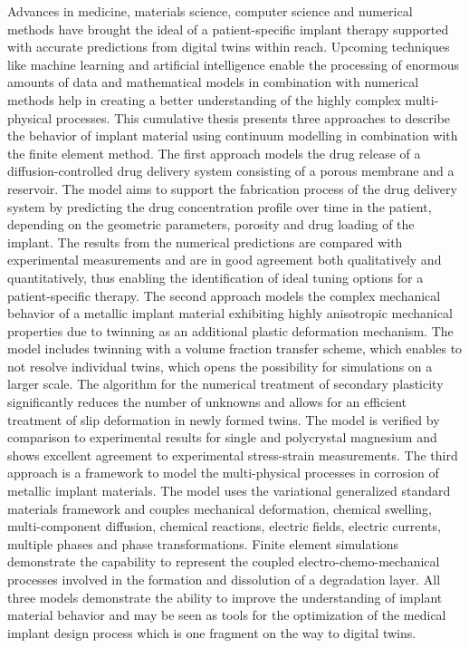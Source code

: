 Advances in medicine, materials science, computer science and numerical methods have brought the ideal of a patient-specific implant therapy supported with accurate predictions from digital twins within reach. Upcoming techniques like machine learning and artificial intelligence enable the processing of enormous amounts of data and mathematical models in combination with numerical methods help in creating a better understanding of the highly complex multi-physical processes. This cumulative thesis presents three approaches to describe the behavior of implant material using continuum modelling in combination with the finite element method. The first approach models the drug release of a diffusion-controlled drug delivery system consisting of a porous membrane and a reservoir. The model aims to support the fabrication process of the drug delivery system by predicting the drug concentration profile over time in the patient, depending on the geometric parameters, porosity and drug loading of the implant. The results from the numerical predictions are compared with experimental measurements and are in good agreement both qualitatively and quantitatively, thus enabling the identification of ideal tuning options for a patient-specific therapy. The second approach models the complex mechanical behavior of a metallic implant material exhibiting highly anisotropic mechanical properties due to twinning as an additional plastic deformation mechanism. The model includes twinning with a volume fraction transfer scheme, which enables to not resolve individual twins, which opens the possibility for simulations on a larger scale. The algorithm for the numerical treatment of secondary plasticity significantly reduces the number of unknowns and allows for an efficient treatment of slip deformation in newly formed twins. The model is verified by comparison to experimental results for single and polycrystal magnesium and shows excellent agreement to experimental stress-strain measurements. The third approach is a framework to model the multi-physical processes in corrosion of metallic implant materials. The model uses the variational generalized standard materials framework and couples mechanical deformation, chemical swelling, multi-component diffusion, chemical reactions, electric fields, electric currents, multiple phases and phase transformations. Finite element simulations demonstrate the capability to represent the coupled electro-chemo-mechanical processes involved in the formation and dissolution of a degradation layer. All three models demonstrate the ability to improve the understanding of implant material behavior and may be seen as tools for the optimization of the medical implant design process which is one fragment on the way to digital twins. 